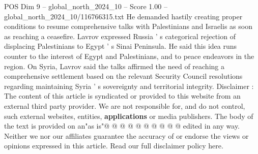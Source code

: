 \begin{textsample}{POS Dim 9 – global\_north\_2024\_10 – Score 1.00 – global\_north\_2024\_10/116766315.txt}
He demanded hastily creating proper conditions to resume comprehensive talks with Palestinians and Israelis as soon as reaching a ceasefire.
Lavrov expressed Russia ' s categorical rejection of displacing Palestinians to Egypt ' s Sinai Peninsula.
He said this idea runs counter to the interest of Egypt and Palestinians, and to peace endeavors in the region.
On Syria, Lavrov said the talks affirmed the need of reaching a comprehensive settlement based on the relevant Security Council resolutions regarding maintaining Syria ' s sovereignty and territorial integrity.
Disclaimer : The content of this article is syndicated or provided to this website from an external third party provider.
We are not responsible for, and do not control, such external websites, entities, \textbf{applications} or media publishers.
The body of the text is provided on an"as is"@ @ @ @ @ @ @ @ @ @ edited in any way.
Neither we nor our affiliates guarantee the accuracy of or endorse the views or opinions expressed in this article.
Read our full disclaimer policy here.

\end{textsample}
